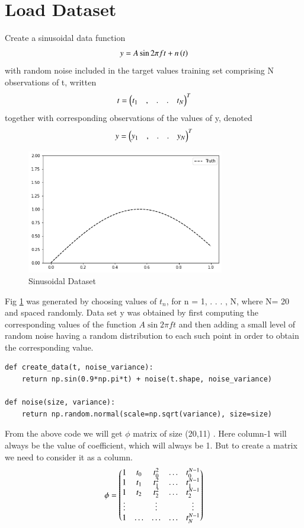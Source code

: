 \documentclass[journal,12pt,twocolumn]{IEEEtran}
\begin{document}
\section{Load Dataset}
Create a sinusoidal data function
\begin{align}
    y = A\sin{2\pi{ft}}+n\left(t\right)
\end{align}
with random noise included in the target values training set comprising N observations of t,
written
\begin{align}
    t=\begin{pmatrix}t_1 &,&.&.& t_N\end{pmatrix}^T 
\end{align}
together with corresponding observations of the values
of y, denoted 
\begin{align}
    y=\begin{pmatrix}y_1 &,&.&.& y_N\end{pmatrix}^T
\end{align}
\begin{figure}[!h]
\begin{center}
\includegraphics[width=3.4in]{a1.png}
\end{center}
\caption{Sinusoidal Dataset}
\label{fig:1}
\end{figure}
Fig \ref{fig:1} was generated by choosing
values of $t_n$, for n = 1, . . . , N, where N= 20 and spaced randomly. Data set y was obtained by first computing the corresponding values of the function $A\sin2\pi{ft}$ and then adding a small level of random noise having a random distribution to each such point in order to obtain the corresponding value.
\begin{lstlisting}
def create_data(t, noise_variance):
    return np.sin(0.9*np.pi*t) + noise(t.shape, noise_variance)

def noise(size, variance):
    return np.random.normal(scale=np.sqrt(variance), size=size)
\end{lstlisting}
From the above code we will get $\phi$ matrix of size (20,11) . Here column-1 will always be the value of coefficient, which will always be 1. But to create a matrix we need to consider it as a column.
\begin{align}
\phi= \begin{pmatrix} 1 & t_{0} & t_{0}^2 & \ldots & t_{0}^{N-1} \\
		1 & t_{1} & t_{1}^2 & \ldots & t_{1}^{N-1} \\
		1 & t_{2} & t_{2}^2 & \ldots & t_{2}^{N-1} \\
		\vdots & & \vdots &  & \vdots  \\
		    1 & \ldots & \ldots & \ldots & t_{N}^{N-1} \end{pmatrix}\label{eq:1}
\end{align}
\end{document}
